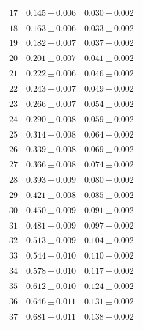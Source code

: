 \documentclass[12pt, a4paper]{article}
\begin{document}
\begin{table}[h!]
{\begin{tabular}{|c|c|c|}
    \footnotesize $17$ & \footnotesize$0.145\pm0.006$ & \footnotesize$0.030\pm0.002$\\
    \footnotesize $18$ & \footnotesize$0.163\pm0.006$ & \footnotesize$0.033\pm0.002$\\
    \footnotesize $19$ & \footnotesize$0.182\pm0.007$ & \footnotesize$0.037\pm0.002$\\
    \footnotesize $20$ & \footnotesize$0.201\pm0.007$ & \footnotesize$0.041\pm0.002$\\
    \footnotesize $21$ & \footnotesize$0.222\pm0.006$ & \footnotesize$0.046\pm0.002$\\
    \footnotesize $22$ & \footnotesize$0.243\pm0.007$ & \footnotesize$0.049\pm0.002$\\ 
    \footnotesize $23$ & \footnotesize$0.266\pm0.007$ & \footnotesize$0.054\pm0.002$\\
    \footnotesize $24$ & \footnotesize$0.290\pm0.008$ & \footnotesize$0.059\pm0.002$\\
    \footnotesize $25$ & \footnotesize$0.314\pm0.008$ & \footnotesize$0.064\pm0.002$\\
    \footnotesize $26$ & \footnotesize$0.339\pm0.008$ & \footnotesize$0.069\pm0.002$\\
    \footnotesize $27$ & \footnotesize$0.366\pm0.008$ & \footnotesize$0.074\pm0.002$\\
    \footnotesize $28$ & \footnotesize$0.393\pm0.009$ & \footnotesize$0.080\pm0.002$\\
    \footnotesize $29$ & \footnotesize$0.421\pm0.008$ & \footnotesize$0.085\pm0.002$\\
    \footnotesize $30$ & \footnotesize$0.450\pm0.009$ & \footnotesize$0.091\pm0.002$\\
    \footnotesize $31$ & \footnotesize$0.481\pm0.009$ & \footnotesize$0.097\pm0.002$\\
    \footnotesize $32$ & \footnotesize$0.513\pm0.009$ & \footnotesize$0.104\pm0.002$\\
    \footnotesize $33$ & \footnotesize$0.544\pm0.010$ & \footnotesize$0.110\pm0.002$\\  
    \footnotesize $34$ & \footnotesize$0.578\pm0.010$ & \footnotesize$0.117\pm0.002$\\
    \footnotesize $35$ & \footnotesize$0.612\pm0.010$ & \footnotesize$0.124\pm0.002$\\
    \footnotesize $36$ & \footnotesize$0.646\pm0.011$ & \footnotesize$0.131\pm0.002$\\
    \footnotesize $37$ & \footnotesize$0.681\pm0.011$ & \footnotesize$0.138\pm0.002$\\

\end{tabular}}
\end{table}
\end{document}
